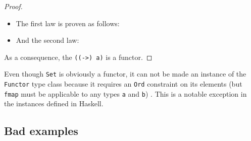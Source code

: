 \begin{example}[\texttt{((->) a)}]

  \begin{proof}
    \hfill
    \begin{itemize}
    \item
      The first law is proven as follows:
      \begin{steps}
      \end{steps}
    \item
      And the second law:
      \begin{steps}
      \end{steps}
    \end{itemize}
    As a consequence, the \texttt{((->) a)} is a functor.
  \end{proof}
\end{example}

\begin{remark}
  Even though \texttt{Set} is obviously a functor, it can not be made
  an instance of the \texttt{Functor} type class because it requires
  an \texttt{Ord} constraint on its elements (but \texttt{fmap} must
  be applicable to any types \texttt{a} and \texttt{b})
  \parencite{yorgey-2009}. This is a notable exception in the
  instances defined in Haskell.

\end{remark}

\begin{example}
\end{example}

\subsection{Bad examples}
\label{sec:functors-haskell-bad-examples}

